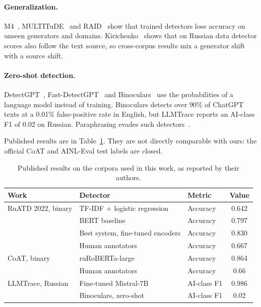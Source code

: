 \documentclass{article}
\begin{document}
\paragraph{Generalization.} M4~\cite{wang2024m4}, MULTITuDE~\cite{macko2023multitude} and
RAID~\cite{dugan2024raid} show that trained detectors lose accuracy on unseen generators and domains.
Kirichenko~\cite{kirichenko2026sameorigin} shows that on Russian data detector scores also follow the text
source, so cross-corpus results mix a generator shift with a source shift.

\paragraph{Zero-shot detection.} DetectGPT~\cite{mitchell2023detectgpt}, Fast-DetectGPT~\cite{bao2024fastdetectgpt}
and Binoculars~\cite{hans2024binoculars} use the probabilities of a language model instead of training.
Binoculars detects over 90\% of ChatGPT texts at a 0.01\% false-positive rate in English, but LLMTrace reports an
AI-class F1 of 0.02 on Russian. Paraphrasing evades such detectors~\cite{krishna2023paraphrasing}.

Published results are in Table~\ref{tab:prior}. They are not directly comparable with ours: the official CoAT and
AINL-Eval test labels are closed.

\begin{table}[tbh!]
\begin{center}
\begin{tabular}{|l|l|l|c|}
\hline
Work & Detector & Metric & Value \\
\hline
RuATD 2022, binary & TF-IDF + logistic regression & Accuracy & 0.642 \\
 & BERT baseline & Accuracy & 0.797 \\
 & Best system, fine-tuned encoders & Accuracy & 0.830 \\
 & Human annotators & Accuracy & 0.667 \\
\hline
CoAT, binary & ruRoBERTa-large & Accuracy & 0.864 \\
 & Human annotators & Accuracy & 0.66 \\
\hline
LLMTrace, Russian & Fine-tuned Mistral-7B & AI-class F1 & 0.986 \\
 & Binoculars, zero-shot & AI-class F1 & 0.02 \\
\hline
\end{tabular}
\caption{Published results on the corpora used in this work, as reported by their authors.}
\label{tab:prior}
\end{center}
\end{table}
\end{document}
